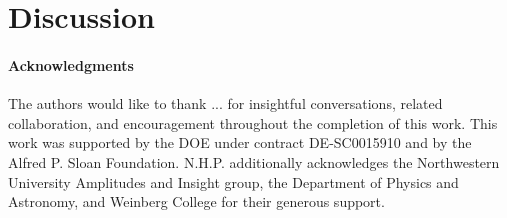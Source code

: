 \documentclass[12pt,letter]{article}
\begin{document}
\section{Discussion}\label{sec:Discussion}


\paragraph{Acknowledgments} The authors would like to thank ... for insightful conversations, related collaboration, and encouragement throughout the completion of this work. This work was supported by the DOE under contract DE-SC0015910 and by the Alfred P. Sloan Foundation. N.H.P. additionally acknowledges the Northwestern University Amplitudes and Insight group, the Department of Physics and Astronomy, and Weinberg College for their generous support. 



\end{document}
